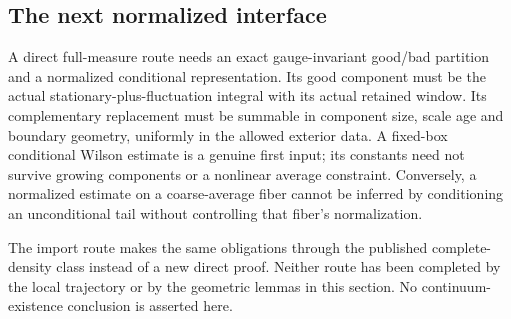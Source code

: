 \subsection{The next normalized interface}
\label{fmg-next}

A direct full-measure route needs an exact gauge-invariant
good/bad partition and a normalized conditional representation.
Its good component must be the actual stationary-plus-fluctuation
integral with its actual retained window. Its complementary
replacement must be summable in component size, scale age and
boundary geometry, uniformly in the allowed exterior data.
A fixed-box conditional Wilson estimate is a genuine first input;
its constants need not survive growing components or a nonlinear
average constraint. Conversely, a normalized estimate on a
coarse-average fiber cannot be inferred by conditioning an
unconditional tail without controlling that fiber's normalization.

The import route makes the same obligations through the published
complete-density class instead of a new direct proof. Neither
route has been completed by the local trajectory or by the
geometric lemmas in this section. No continuum-existence conclusion
is asserted here.
